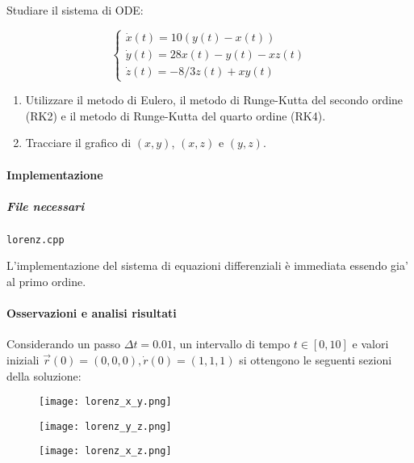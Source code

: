Studiare il sistema di ODE:

\begin{equation}
	\begin{cases}
		\dot{x}(t) = 10(y(t) - x(t))       \\
		\dot{y}(t) = 28x(t) - y(t) - xz(t) \\
		\dot{z}(t) = -8/3 z(t) + xy(t)
	\end{cases}
\end{equation}

\begin{enumerate}
	\item Utilizzare il metodo di Eulero, il metodo di Runge-Kutta del secondo ordine (RK2) e il metodo di Runge-Kutta del quarto ordine (RK4).
	\item Tracciare il grafico di $(x, y)$, $(x, z)$ e $(y, z)$.
\end{enumerate}

\paragraph{Implementazione}

\subparagraph{File necessari} \texttt{lorenz.cpp}

L'implementazione del sistema di equazioni differenziali è immediata essendo gia'
al primo ordine.

\paragraph{Osservazioni e analisi risultati}

Considerando un passo $\Delta t = 0.01$, un intervallo di tempo $t \in [0, 10]$ e valori iniziali $\vec{r}(0)=(0,0,0), \dot{r}(0)=(1,1,1)$ si ottengono le seguenti sezioni della soluzione:

\begin{figure} [H]
	\centering
	\texttt{[image: lorenz\_x\_y.png]}
\end{figure}

\begin{figure} [H]
	\centering
	\texttt{[image: lorenz\_y\_z.png]}
\end{figure}

\begin{figure} [H]
	\centering
	\texttt{[image: lorenz\_x\_z.png]}
\end{figure}

